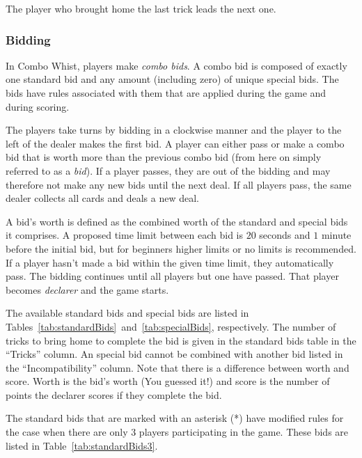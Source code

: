 \documentclass[a4paper]{article}
\begin{document}
{{{				 The player who brought home the last trick leads the next one.
			}

			\subsubsection{Bidding}{\label{sec:bidding}
				In Combo Whist, players make \emph{combo bids}. A combo bid is composed of exactly one standard bid and any amount (including zero) of unique special bids. The bids have rules associated with them that are applied during the game and during scoring.

				The players take turns by bidding in a clockwise manner and the player to the left of the dealer makes the first bid. A player can either pass or make a combo bid that is worth more than the previous combo bid (from here on simply referred to as a \emph{bid}). If a player passes, they are out of the bidding and may therefore not make any new bids until the next deal. If all players pass, the same dealer collects all cards and deals a new deal.

				A bid's worth is defined as the combined worth of the standard and special bids it comprises. A proposed time limit between each bid is $20$ seconds and $1$ minute before the initial bid, but for beginners higher limits or no limits is recommended. If a player hasn't made a bid within the given time limit, they automatically pass. The bidding continues until all players but one have passed. That player becomes \emph{declarer} and the game starts.

				The available standard bids and special bids are listed in Tables~\ref{tab:standardBids}~and~\ref{tab:specialBids}, respectively. The number of tricks to bring home to complete the bid is given in the standard bids table in the ``Tricks'' column. An special bid cannot be combined with another bid listed in the ``Incompatibility'' column. Note that there is a difference between worth and score. Worth is the bid's worth (You guessed it!) and score is the number of points the declarer scores if they complete the bid.

				The standard bids that are marked with an asterisk (*) have modified rules for the case when there are only $3$ players participating in the game. These bids are listed in Table~\ref{tab:standardBids3}.

				
				
				\restoregeometry%
			}

}}
\end{document}
